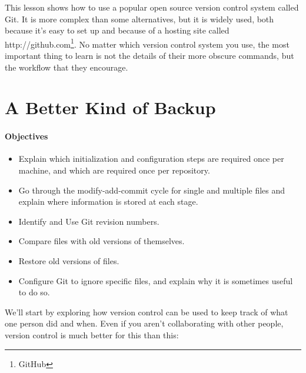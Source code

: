 \documentclass[]{book}
\newcommand{\urlfoot}[2]{{#1}\footnote{#2}}
\begin{document}
This lesson shows how to use a popular open source version control
system called Git. It is more complex than some alternatives, but it is
widely used, both because it's easy to set up and because of a hosting
site called \urlfoot{http://github.com}{GitHub}. No matter which version
control system you use, the most important thing to learn is not the
details of their more obscure commands, but the workflow that they
encourage.

\section{A Better Kind of Backup}

\mbox{}\paragraph{Objectives}

\begin{itemize}
\item
  Explain which initialization and configuration steps are required once
  per machine, and which are required once per repository.
\item
  Go through the modify-add-commit cycle for single and multiple files
  and explain where information is stored at each stage.
\item
  Identify and Use Git revision numbers.
\item
  Compare files with old versions of themselves.
\item
  Restore old versions of files.
\item
  Configure Git to ignore specific files, and explain why it is
  sometimes useful to do so.
\end{itemize}

We'll start by exploring how version control can be used to keep track
of what one person did and when. Even if you aren't collaborating with
other people, version control is much better for this than this:
\end{document}
